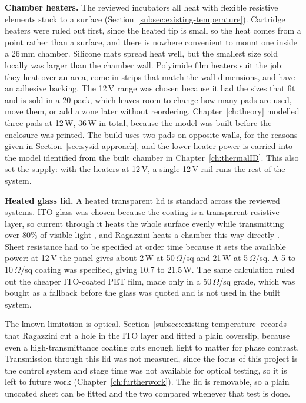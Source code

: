 \textbf{Chamber heaters.} The reviewed incubators all heat with flexible resistive elements stuck to a surface (Section~\ref{subsec:existing-temperature}). Cartridge heaters were ruled out first, since the heated tip is small so the heat comes from a point rather than a surface, and there is nowhere convenient to mount one inside a 26\,mm chamber. Silicone mats spread heat well, but the smallest size sold locally was larger than the chamber wall. Polyimide film heaters suit the job: they heat over an area, come in strips that match the wall dimensions, and have an adhesive backing. The 12\,V range was chosen because it had the sizes that fit and is sold in a 20-pack, which leaves room to change how many pads are used, move them, or add a zone later without reordering. Chapter~\ref{ch:theory} modelled three pads at 12\,W, 36\,W in total, because the model was built before the enclosure was printed. The build uses two pads on opposite walls, for the reasons given in Section~\ref{sec:sysid-approach}, and the lower heater power is carried into the model identified from the built chamber in Chapter~\ref{ch:thermalID}. This also set the supply: with the heaters at 12\,V, a single 12\,V rail runs the rest of the system.

\textbf{Heated glass lid.} A heated transparent lid is standard across the reviewed systems. ITO glass was chosen because the coating is a transparent resistive layer, so current through it heats the whole surface evenly while transmitting over 80\% of visible light \citep{konshen_ito_2026}, and Ragazzini heats a chamber this way directly \citep{ragazzini_fabrication_2019}. Sheet resistance had to be specified at order time because it sets the available power: at 12\,V the panel gives about 2\,W at 50\,$\Omega$/sq and 21\,W at 5\,$\Omega$/sq. A 5 to 10\,$\Omega$/sq coating was specified, giving 10.7 to 21.5\,W. The same calculation ruled out the cheaper ITO-coated PET film, made only in a 50\,$\Omega$/sq grade, which was bought as a fallback before the glass was quoted and is not used in the built system.

The known limitation is optical. Section~\ref{subsec:existing-temperature} records that Ragazzini cut a hole in the ITO layer and fitted a plain coverslip, because even a high-transmittance coating cuts enough light to matter for phase contrast. Transmission through this lid was not measured, since the focus of this project is the control system and stage time was not available for optical testing, so it is left to future work (Chapter~\ref{ch:furtherwork}). The lid is removable, so a plain uncoated sheet can be fitted and the two compared whenever that test is done.

